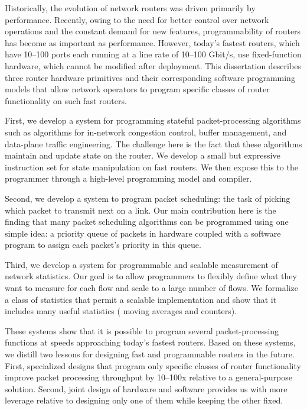 % 
% 
%
Historically, the evolution of network routers was driven primarily by
performance. Recently, owing to the need for better control over network
operations and the constant demand for new features, programmability of routers
has become as important as performance.  However, today's fastest routers,
which have 10--100 ports each running at a line rate of 10--100 Gbit/s, use
fixed-function hardware, which cannot be modified after deployment. This
dissertation describes three router hardware primitives and their
corresponding software programming models that allow network operators to
program specific classes of router functionality on such fast routers.

First, we develop a system for programming stateful packet-processing
algorithms such as algorithms for in-network congestion control, buffer
management, and data-plane traffic engineering. The challenge here is the fact
that these algorithms maintain and update state on the router.  We develop a
small but expressive instruction set for state manipulation on fast routers.
 We then expose this to the programmer through a high-level programming model
and compiler.

Second, we develop a system to program packet scheduling: the task of picking
which packet to transmit next on a link. Our main contribution here is the
finding that many packet scheduling algorithms can be programmed using one
simple idea: a priority queue of packets in hardware coupled with a software
program to assign each packet's priority in this queue.

Third, we develop a system for programmable and scalable measurement of network
statistics. Our goal is to allow programmers to flexibly define what they want
to measure for each flow and scale to a large number of flows. We formalize
a class of statistics that permit a scalable
implementation and show that it includes many useful statistics (\eg
moving averages and counters).

These systems show that it is possible to program several packet-processing
functions at speeds approaching today's fastest routers. Based on these systems, we
distill two lessons for designing fast and programmable routers in the future.
First, specialized designs that program only specific classes of router
functionality improve packet processing throughput by 10--100x relative to a general-purpose
solution. Second, joint design of
hardware and software provides us with more leverage relative to designing only
one of them while keeping the other fixed.

